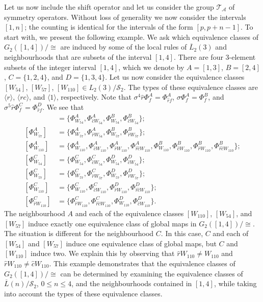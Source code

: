 \documentclass[a4paper]{article}
\begin{document}
Let us now include the shift operator and let us consider the group $\mathcal{T}_\mathcal{A}$
of symmetry operators.
Without loss of generality we now consider the intervals $[1,n]$;
the counting is identical for the intervals of the form $[p, p+n-1]$.
To start with, we present the following example.
We ask which equivalence classes of $G_2([1,4])/{\cong}$ are induced
by some of the local rules of $\overline{L}_2(3)$ and neighbourhoods that are subsets of the interval $[1,4]$.
There are  four 3-element subsets of the integer interval $[1,4]$, which we denote by
$A=[1,3]$, $B=[2,4]$, $C=\{1,2,4\}$, and $D=\{1,3,4\}$.
Let us now consider the equivalence classes
$[W_{54}]$, $[W_{57}]$, $[W_{110}] \in L_2(3) / \mathcal{S}_2$.
The types of these equivalence classes are $\langle r \rangle$, $\langle rc \rangle$, and $\langle 1 \rangle$, respectively.
Note that $\sigma^4 \hat{r} \Phi^A_f = \Phi^A_{\hat{r}f}$, $\sigma \Phi^A_f = \Phi^B_f$, and
$\sigma^5 \hat{r} \Phi^C_f = \Phi^D_{\hat{r}f}$.
We see that
\begin{align*}
[\Phi^{A}_{W_{54}}] & = \{ \Phi^{A}_{W_{54}}, \Phi^{A}_{\hat{c}W_{54}}, \Phi^{B}_{W_{54}},
        \Phi^{B}_{\hat{c}W_{54}} \}; \\
[\Phi^{A}_{W_{57}}] & = \{ \Phi^{A}_{W_{57}}, \Phi^{A}_{\hat{r}W_{54}}, \Phi^{B}_{W_{57}},
        \Phi^{B}_{\hat{r}W_{57}} \}; \\
[\Phi^{A}_{W_{110}}] & = \{ \Phi^{A}_{W_{110}}, \Phi^{A}_{\hat{c}W_{110}}, \Phi^{A}_{\hat{r}W_{110}},
        \Phi^{A}_{\widehat{rc}W_{110}},
        \Phi^{B}_{W_{110}}, \Phi^{B}_{\hat{c}W_{110}}, \Phi^{B}_{\hat{r}W_{110}},
        \Phi^{B}_{\widehat{rc}W_{110}}
\}; \\
[\Phi^{C}_{W_{54}}] & = \{ \Phi^{C}_{W_{54}}, \Phi^{C}_{\hat{c}W_{54}}, \Phi^{D}_{W_{54}},
        \Phi^{D}_{\hat{c}W_{54}} \}; \\
[\Phi^{C}_{W_{57}}] & = \{ \Phi^{C}_{W_{57}}, \Phi^{C}_{\hat{r}W_{57}}, \Phi^{D}_{W_{57}},
        \Phi^{D}_{\hat{r}W_{57}} \}; \\
[\Phi^{C}_{W_{110}}] & = \{ \Phi^{C}_{W_{110}}, \Phi^{C}_{\hat{c}W_{110}}, \Phi^{D}_{\hat{r}W_{110}},
        \Phi^{D}_{\widehat{rc}W_{110}} \}; \\
[\Phi^{C}_{\hat{r}W_{110}}] & = \{ \Phi^{C}_{\hat{r}W_{110}}, \Phi^{C}_{\widehat{rc}W_{110}},
        \Phi^{D}_{W_{110}}, \Phi^{D}_{\hat{c}W_{110}} \}.
\end{align*}
The neighbourhood $A$ and each of the equivalence classes $[W_{110}]$, $[W_{54}]$, and $[W_{57}]$
induce exactly one equivalence class of global maps in $G_2([1,4])/{\cong}$.
The situation is different for the neighbourhood $C$.
In this case, $C$ and each of $[W_{54}]$ and $[W_{57}]$ induce one equivalence class of global maps,
but $C$ and $[W_{110}]$ induce two.
We explain this by observing that $\hat{r}W_{110} \ne W_{110}$ and
$\hat{r}W_{110} \ne \hat{c}W_{110}$.
This example demonstrates that the equivalence classes of $G_2([1,4])/{\cong}$ can be determined by examining
the equivalence classes of $\overline{L}(n)/\mathcal{S}_2$, $0 \le n \le 4$, and the neighbourhoods contained
in $[1,4]$, while taking into account the types of these equivalence classes.
\end{document}
